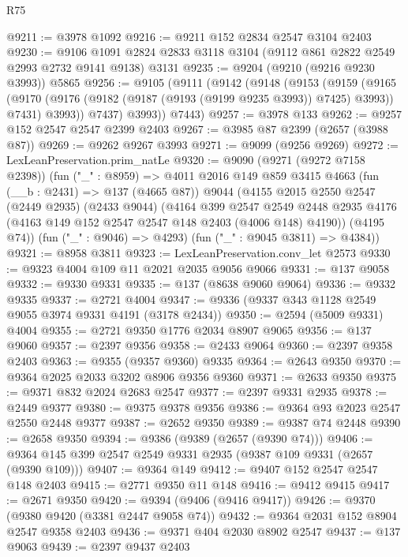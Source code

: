 \begin{lexlean}{R75}
\begin{coremodule}
@9211 := @3978 @1092
@9216 := @9211 @152 @2834 @2547 @3104 @2403
@9230 := @9106 @1091 @2824 @2833 @3118 @3104 (@9112 @861 @2822 @2549 @2993 @2732 @9141 @9138) @3131
@9235 := @9204 (@9210 (@9216 @9230 @3993)) @5865
@9256 := @9105
    (@9111
      (@9142
        (@9148
          (@9153
            (@9159
              (@9165
                (@9170 (@9176 (@9182 (@9187 (@9193 (@9199 @9235 @3993)) @7425) @3993)) @7431)
                @3993))
            @7437)
          @3993))
      @7443)
@9257 := @3978 @133
@9262 := @9257 @152 @2547 @2547 @2399 @2403
@9267 := @3985 @87 @2399 (@2657 (@3988 @87))
@9269 := @9262 @9267 @3993
@9271 := @9099 (@9256 @9269)
@9272 := LexLeanPreservation.prim_natLe
@9320 := @9090
    (@9271 (@9272 @7158 @2398))
    (fun ("_" : @8959) =>
    @4011
      @2016
      @149
      @859
      @3415
      @4663
      (fun (__b : @2431) => @137 (@4665 @87))
      @9044
      (@4155
        @2015
        @2550
        @2547
        (@2449 @2935)
        (@2433 @9044)
        (@4164
          @399
          @2547
          @2549
          @2448
          @2935
          @4176
          (@4163 @149 @152 @2547 @2547 @148 @2403 (@4006 @148) @4190))
        (@4195 @74))
      (fun ("_" : @9046) => @4293)
      (fun ("_" : @9045 @3811) => @4384))
@9321 := @8958 @3811
@9323 := LexLeanPreservation.conv_let @2573
@9330 := @9323 @4004 @109 @11 @2021 @2035 @9056 @9066
@9331 := @137 @9058
@9332 := @9330 @9331
@9335 := @137 (@8638 @9060 @9064)
@9336 := @9332 @9335
@9337 := @2721 @4004
@9347 := @9336 (@9337 @343 @1128 @2549 @9055 @3974 @9331 @4191 (@3178 @2434))
@9350 := @2594 (@5009 @9331) @4004
@9355 := @2721 @9350 @1776 @2034 @8907 @9065
@9356 := @137 @9060
@9357 := @2397 @9356
@9358 := @2433 @9064
@9360 := @2397 @9358 @2403
@9363 := @9355 (@9357 @9360) @9335
@9364 := @2643 @9350
@9370 := @9364 @2025 @2033 @3202 @8906 @9356 @9360
@9371 := @2633 @9350
@9375 := @9371 @832 @2024 @2683 @2547
@9377 := @2397 @9331 @2935
@9378 := @2449 @9377
@9380 := @9375 @9378 @9356
@9386 := @9364 @93 @2023 @2547 @2550 @2448 @9377
@9387 := @2652 @9350
@9389 := @9387 @74 @2448
@9390 := @2658 @9350
@9394 := @9386 (@9389 (@2657 (@9390 @74)))
@9406 := @9364 @145 @399 @2547 @2549 @9331 @2935 (@9387 @109 @9331 (@2657 (@9390 @109)))
@9407 := @9364 @149
@9412 := @9407 @152 @2547 @2547 @148 @2403
@9415 := @2771 @9350 @11 @148
@9416 := @9412 @9415
@9417 := @2671 @9350
@9420 := @9394 (@9406 (@9416 @9417))
@9426 := @9370 (@9380 @9420 (@3381 @2447 @9058 @74))
@9432 := @9364 @2031 @152 @8904 @2547 @9358 @2403
@9436 := @9371 @404 @2030 @8902 @2547
@9437 := @137 @9063
@9439 := @2397 @9437 @2403

\end{coremodule}
\end{lexlean}

